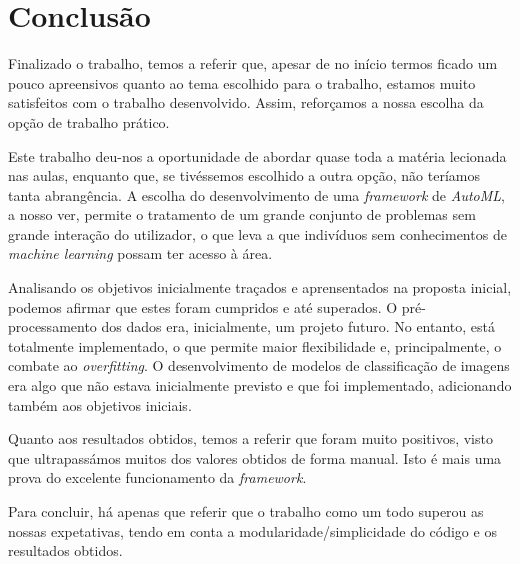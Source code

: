 \documentclass[a4paper]{report}
\begin{document}
\chapter{Conclusão} \label{ch:Conclusion}
\large{
	Finalizado o trabalho, temos a referir que, apesar de no início termos ficado um pouco apreensivos quanto ao tema escolhido para o trabalho, estamos muito satisfeitos com o trabalho desenvolvido. 
	Assim, reforçamos a nossa escolha da opção de trabalho prático.

	Este trabalho deu-nos a oportunidade de abordar quase toda a matéria lecionada nas aulas, enquanto que, se tivéssemos escolhido a outra opção, não teríamos tanta abrangência.
	A escolha do desenvolvimento de uma \textit{framework} de \textsl{AutoML}, a nosso ver, permite o tratamento de um grande conjunto de problemas sem grande interação do utilizador, o que leva a que indivíduos sem conhecimentos de \textit{machine learning} possam ter acesso à área.
	
	Analisando os objetivos inicialmente traçados e aprensentados na proposta inicial, podemos afirmar que estes foram cumpridos e até superados.
	O pré-processamento dos dados era, inicialmente, um projeto futuro. 
	No entanto, está totalmente implementado, o que permite maior flexibilidade e, principalmente, o combate ao \textit{overfitting}.
	O desenvolvimento de modelos de classificação de imagens era algo que não estava inicialmente previsto e que foi implementado, adicionando também aos objetivos iniciais.

	Quanto aos resultados obtidos, temos a referir que foram muito positivos, visto que ultrapassámos muitos dos valores obtidos de forma manual. Isto é mais uma prova do excelente funcionamento da \textit{framework}.
	
	Para concluir, há apenas que referir que o trabalho como um todo superou as nossas expetativas, tendo em conta a modularidade/simplicidade do código e os resultados obtidos.
}

\appendix
\end{document}
